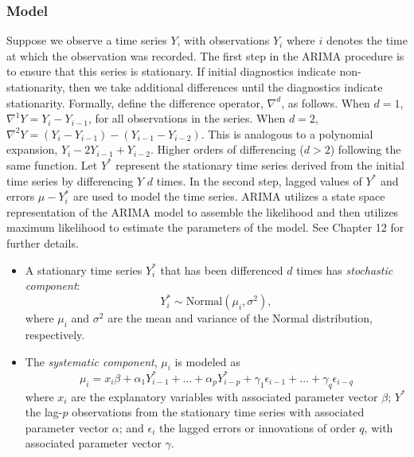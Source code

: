 \subsubsection*{Model}
Suppose we observe a time series $Y$, with observations $Y_i$ where
$i$ denotes the time at which the observation was recorded.  The first
step in the ARIMA procedure is to ensure that this series is
stationary.  If initial diagnostics indicate non-stationarity, then we
take additional differences until the diagnostics indicate
stationarity.  Formally, define the difference operator, $\nabla^
{d}$, as follows.  When $d = 1$, $\nabla^{1} Y = Y_i - Y_{i-1}$, for
all observations in the series.  When $d=2$, $\nabla^2 Y = (Y_{i} -
Y_{i-1}) - (Y_{i-1} - Y_{i-2})$.  This is analogous to a polynomial
expansion, $Y_{i} - 2Y_{i-1} + Y_{i-2}$.  Higher orders of
differencing ($d > 2$) following the same function.  Let $Y^*$
represent the stationary time series derived from the initial time
series by differencing $Y$ $d$ times.  In the second step, lagged
values of $Y^{*}$ and errors $\mu - Y^*_i$ are used to model the time
series.  ARIMA utilizes a state space representation of the ARIMA
model to assemble the likelihood and then utilizes maximum likelihood
to estimate the parameters of the model.  See \cite{BroDav91} Chapter
12 for further details.
\begin{itemize}
\item A stationary time series $Y_i^*$ that has been differenced $d$
times has \textit{stochastic component}:
\begin{equation*} 
Y_i^* \sim \text{Normal} (\mu_i, \sigma^2),
\end{equation*}
where $\mu_i$ and $\sigma^2$ are the mean and variance of the Normal
distribution, respectively.  
\item The \textit{systematic component}, $\mu_i$ is modeled as
\begin{equation*}
\mu_i = x_i \beta + \alpha_1 Y_{i-1}^* + \hdots + \alpha_p Y_{i-p}^*
+ \gamma_1\epsilon_{i-1} + \hdots + \gamma_q \epsilon_{i-q}
\end{equation*}
where $x_i$ are the explanatory variables with associated parameter
vector $\beta$; $Y^*$ the lag-$p$ observations from the stationary time
series with associated parameter vector $\alpha$; and $\epsilon_i$ the
lagged errors or innovations of order $q$, with associated parameter vector
$\gamma$.   
\end{itemize}

